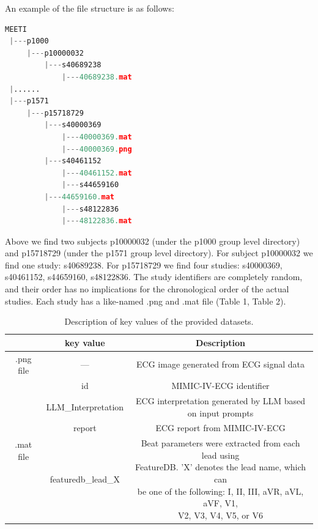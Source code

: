 \documentclass[12pt,letterpaper]{article}
\begin{document}
An example of the file structure is as follows:

\begin{lstlisting}[language=Python]
 MEETI
 |---p1000
     |---p10000032
         |---s40689238
             |---40689238.mat
 |......
 |---p1571
     |---p15718729
         |---s40000369
             |---40000369.mat
             |---40000369.png
         |---s40461152
             |---40461152.mat
             |---s44659160
         |---44659160.mat
             |---s48122836
             |---48122836.mat
\end{lstlisting}

Above we find two subjects p10000032 (under the p1000 group level directory) and p15718729 (under the p1571 group level directory). For subject p10000032 we find one study: s40689238. For p15718729 we find four studies: s40000369, s40461152, s44659160, s48122836. The study identifiers are completely random, and their order has no implications for the chronological order of the actual studies. Each study has a like-named .png and .mat file (Table 1, Table 2).

\begin{table}[!htbp]
\centering
\caption{Description of key values of the provided datasets.}
\label{tab1}
\renewcommand{\arraystretch}{2}
{%
\begin{tabular}{c c c}
\toprule
 & key value & Description \\
\midrule
.png file & --- & ECG image generated from ECG signal data \\
\midrule
\multirow{4}{*}{.mat file} & id & MIMIC-IV-ECG identifier \\
\cline{2-3}
 & LLM\_Interpretation & \makecell{ECG interpretation generated by LLM based \\ on input prompts} \\
\cline{2-3}
 & report & ECG report from MIMIC-IV-ECG \\
\cline{2-3}
 & featuredb\_lead\_X & \makecell{Beat parameters were extracted from each lead using \\ FeatureDB. 'X' denotes the lead name, which can \\ be one of the following: I, II, III, aVR, aVL, aVF, V1, \\ V2, V3, V4, V5, or V6} \\
\bottomrule
\end{tabular}
}
\end{table}
\end{document}
